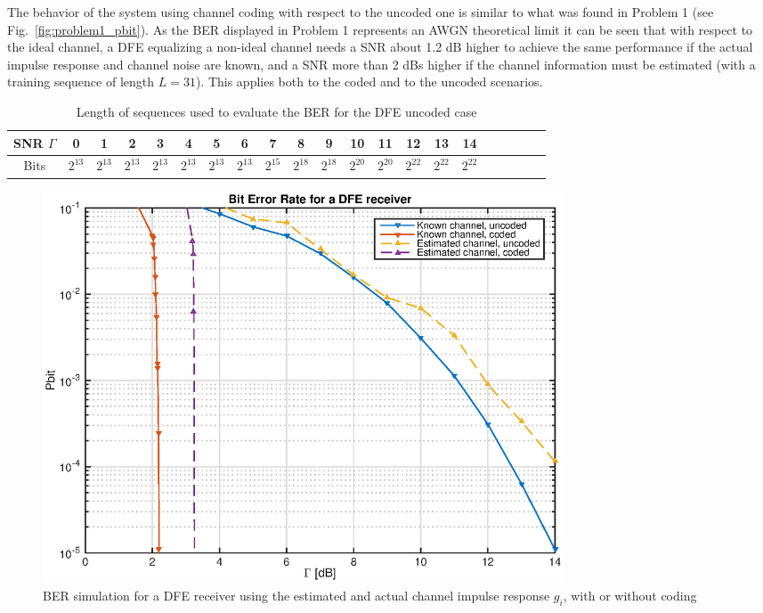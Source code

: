 \documentclass[10pt]{article}
\begin{document}
The behavior of the system using channel coding with respect to the uncoded one is similar to what was found in Problem 1 (see Fig.~\ref{fig:problem1_pbit}). As the BER displayed in Problem 1 represents an AWGN theoretical limit it can be seen that with respect to the ideal channel, a DFE equalizing a non-ideal channel needs a SNR about 1.2 dB higher to achieve the same performance if the actual impulse response and channel noise are known, and a SNR more than 2 dBs higher if the channel information must be estimated (with a training sequence of length $L=31$). This applies both to the coded and to the uncoded scenarios. %
\begin{table}[h!]
	\begin{tabular}{c|c|c|c|c|c|c|c|c|c|c|c|c|c|c|c|c|c|c|c|c}
		SNR $\Gamma$	& 0 & 1 & 2 & 3 & 4 &	5	&	6	&	7	&	8	&	9	&	10	&	11	&	12	&	13	&	14	\\ \hline	
		Bits	& $2^{13}$ & $2^{13}$ & $2^{13}$ & $2^{13}$ & $2^{13}$ & $2^{13}$ & $2^{13}$ & $2^{15}$ & $2^{18}$ & $2^{18}$ & $2^{20}$ & $2^{20}$ & $2^{22}$ & $2^{22}$ & $2^{22}$ \\
	\end{tabular}
	\caption{Length of sequences used to evaluate the BER for the DFE uncoded case}
	\label{table:BER_len_DFE}
\end{table}


\begin{figure}[h!]
	\centering
	\includegraphics[width = 0.75\textwidth]{problem2}
	\caption{BER simulation for a DFE receiver using the estimated and actual channel impulse response $g_i$, with or without coding}
	\label{fig:problem2_pbit}
\end{figure}
\end{document}
